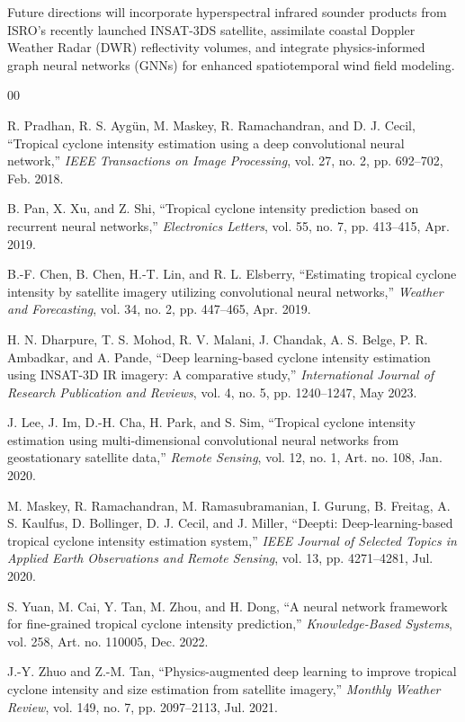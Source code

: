 \documentclass[conference]{IEEEtran}
\begin{document}
Future directions will incorporate hyperspectral infrared sounder products from ISRO's recently launched INSAT-3DS satellite, assimilate coastal Doppler Weather Radar (DWR) reflectivity volumes, and integrate physics-informed graph neural networks (GNNs) for enhanced spatiotemporal wind field modeling.

\begin{thebibliography}{00}

R. Pradhan, R. S. Aygün, M. Maskey, R. Ramachandran, and D. J. Cecil,
``Tropical cyclone intensity estimation using a deep convolutional neural network,''
\textit{IEEE Transactions on Image Processing}, vol. 27, no. 2, pp. 692--702, Feb. 2018.

B. Pan, X. Xu, and Z. Shi,
``Tropical cyclone intensity prediction based on recurrent neural networks,''
\textit{Electronics Letters}, vol. 55, no. 7, pp. 413--415, Apr. 2019.

B.-F. Chen, B. Chen, H.-T. Lin, and R. L. Elsberry,
``Estimating tropical cyclone intensity by satellite imagery utilizing convolutional neural networks,''
\textit{Weather and Forecasting}, vol. 34, no. 2, pp. 447--465, Apr. 2019.

H. N. Dharpure, T. S. Mohod, R. V. Malani, J. Chandak, A. S. Belge, P. R. Ambadkar, and A. Pande,
``Deep learning-based cyclone intensity estimation using INSAT-3D IR imagery: A comparative study,''
\textit{International Journal of Research Publication and Reviews}, vol. 4, no. 5, pp. 1240--1247, May 2023.

J. Lee, J. Im, D.-H. Cha, H. Park, and S. Sim,
``Tropical cyclone intensity estimation using multi-dimensional convolutional neural networks from geostationary satellite data,''
\textit{Remote Sensing}, vol. 12, no. 1, Art. no. 108, Jan. 2020.

M. Maskey, R. Ramachandran, M. Ramasubramanian, I. Gurung, B. Freitag, A. S. Kaulfus, D. Bollinger, D. J. Cecil, and J. Miller,
``Deepti: Deep-learning-based tropical cyclone intensity estimation system,''
\textit{IEEE Journal of Selected Topics in Applied Earth Observations and Remote Sensing}, vol. 13, pp. 4271--4281, Jul. 2020.

S. Yuan, M. Cai, Y. Tan, M. Zhou, and H. Dong,
``A neural network framework for fine-grained tropical cyclone intensity prediction,''
\textit{Knowledge-Based Systems}, vol. 258, Art. no. 110005, Dec. 2022.

J.-Y. Zhuo and Z.-M. Tan,
``Physics-augmented deep learning to improve tropical cyclone intensity and size estimation from satellite imagery,''
\textit{Monthly Weather Review}, vol. 149, no. 7, pp. 2097--2113, Jul. 2021.


\end{thebibliography}
\end{document}
